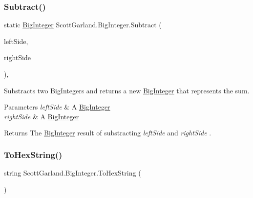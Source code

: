 \subsubsection{\texorpdfstring{Subtract()}{Subtract()}}
{\footnotesize\ttfamily static \hyperlink{class_scott_garland_1_1_big_integer}{Big\+Integer} Scott\+Garland.\+Big\+Integer.\+Subtract (\begin{DoxyParamCaption}\item[{\hyperlink{class_scott_garland_1_1_big_integer}{Big\+Integer}}]{left\+Side,  }\item[{\hyperlink{class_scott_garland_1_1_big_integer}{Big\+Integer}}]{right\+Side }\end{DoxyParamCaption})\hspace{0.3cm}{\ttfamily [inline]}, {\ttfamily [static]}}



Substracts two Big\+Integers and returns a new \hyperlink{class_scott_garland_1_1_big_integer}{Big\+Integer} that represents the sum. 


\begin{DoxyParams}{Parameters}
{\em left\+Side} & A \hyperlink{class_scott_garland_1_1_big_integer}{Big\+Integer}\\
\hline
{\em right\+Side} & A \hyperlink{class_scott_garland_1_1_big_integer}{Big\+Integer}\\
\hline
\end{DoxyParams}
\begin{DoxyReturn}{Returns}
The \hyperlink{class_scott_garland_1_1_big_integer}{Big\+Integer} result of substracting {\itshape left\+Side}  and {\itshape right\+Side} .
\end{DoxyReturn}
\mbox{\label{class_scott_garland_1_1_big_integer_a743cb38de54da022a77772bcbb0d80ec}} 
\subsubsection{\texorpdfstring{To\+Hex\+String()}{ToHexString()}}
{\footnotesize\ttfamily string Scott\+Garland.\+Big\+Integer.\+To\+Hex\+String (\begin{DoxyParamCaption}{ }\end{DoxyParamCaption})\hspace{0.3cm}{\ttfamily [inline]}}



